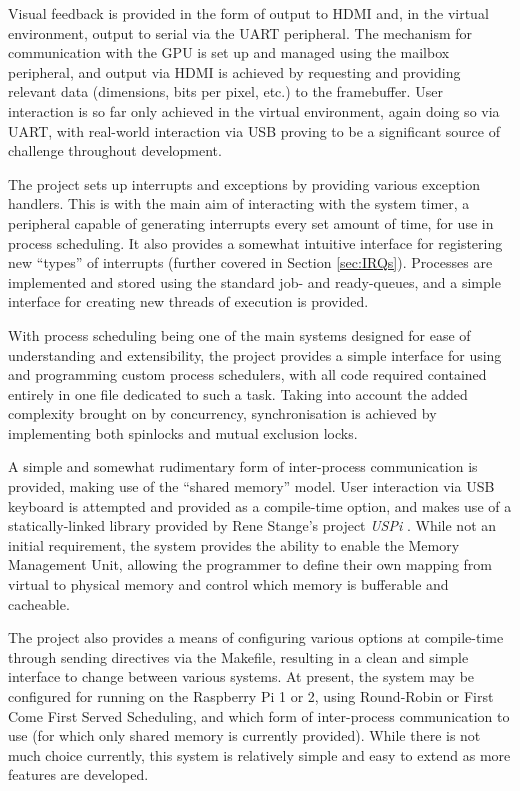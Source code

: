     Visual feedback is provided in the form of output to HDMI and, in the
    virtual environment, output to serial via the UART peripheral.  The
    mechanism for communication with the GPU is set up and managed using the
    mailbox peripheral, and output via HDMI is achieved by requesting and
    providing relevant data (dimensions, bits per pixel, etc.) to the
    framebuffer. User interaction is so far only achieved in the virtual
    environment, again doing so via UART, with real-world interaction via USB
    proving to be a significant source of challenge throughout development.

    The project sets up interrupts and exceptions by providing various exception
    handlers. This is with the main aim of interacting with the system timer, a
    peripheral capable of generating interrupts every set amount of time, for
    use in process scheduling. It also provides a somewhat intuitive interface
    for registering new ``types'' of interrupts (further covered in Section
    \ref{sec:IRQs}). Processes are implemented and stored using the standard
    job- and ready-queues, and a simple interface for creating new threads of
    execution is provided.

    With process scheduling being one of the main systems designed for ease of
    understanding and extensibility, the project provides a simple interface for
    using and programming custom process schedulers, with all code required
    contained entirely in one file dedicated to such a task.  Taking into
    account the added complexity brought on by concurrency, synchronisation is
    achieved by implementing both spinlocks and mutual exclusion locks.
    
    A simple and somewhat rudimentary form of inter-process communication is
    provided, making use of the ``shared memory'' model. User interaction via
    USB keyboard is attempted and provided as a compile-time option, and makes
    use of a statically-linked library provided by Rene Stange's project
    \textit{USPi} \cite{USPi}. While not an initial requirement, the system
    provides the ability to enable the Memory Management Unit, allowing the
    programmer to define their own mapping from virtual to physical memory and
    control which memory is bufferable and cacheable.

    The project also provides a means of configuring various options at
    compile-time through sending directives via the Makefile, resulting in a
    clean and simple interface to change between various systems. At present,
    the system may be configured for running on the Raspberry Pi 1 or 2, using
    Round-Robin or First Come First Served Scheduling, and which form of
    inter-process communication to use (for which only shared memory is
    currently provided). While there is not much choice currently, this system
    is relatively simple and easy to extend as more features are developed.

